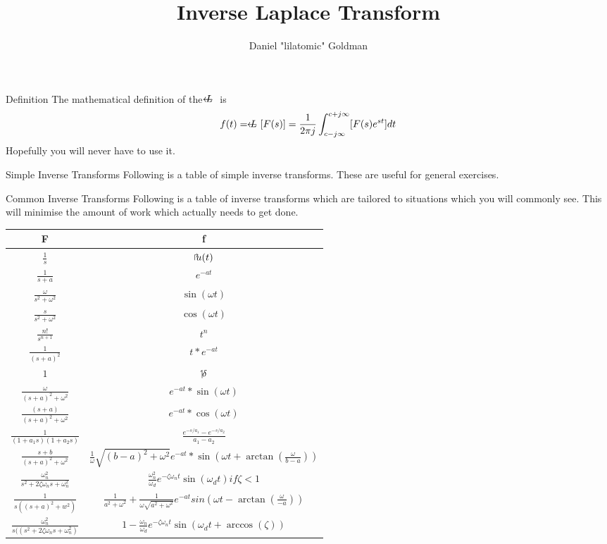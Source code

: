 \documentclass{../templates/mathtool}
\title{Inverse Laplace Transform}
\author{Daniel "lilatomic" Goldman}
\begin{document}
\maketitle

\begin{section}{Definition}
	The mathematical definition of the $\ilaplace$ is
	\begin{equation}
		f(t) = \ilaplace[F(s)] = \frac{1}{2\pi j}\int_{c-j\infty}^{c+j\infty}[F(s)e^{st}]dt
	\end{equation}
	Hopefully you will never have to use it.
\end{section}

\begin{section}{Simple Inverse Transforms}
	Following is a table of simple inverse transforms. These are useful for general exercises.
\end{section}

\begin{section}{Common Inverse Transforms}
	Following is a table of inverse transforms which are tailored to situations which you will commonly see. This will minimise the amount of work which actually needs to get done.
	
\end{section}
	\begin{tabular}{|c|c|}
		\hline
		F & f \\
		\hline \hline
		$\frac{1}{s}$ & $\ustep(t)$ \\
			\hline
		$\frac{1}{s+a}$ & $e^{-at}$ \\
			\hline
		$\frac{\omega}{s^2+\omega^2}$ & $\sin{(\omega t)}$ \\
			\hline
		$\frac{s}{s^2+\omega^2}$ & $\cos{(\omega t)}$ \\
			\hline
		$\frac{n!}{s^{n+1}}$ & $t^n$ \\
			\hline
		$\frac{1}{(s+a)^2}$ & $t*e^{-at}$ \\
			\hline
		$1$ & $\impulse$ \\
			\hline
		$\frac{\omega}{(s+a)^2+\omega^2}$ & $e^{-at}*\sin{(\omega t)}$ \\
			\hline
		$\frac{(s+a)}{(s+a)^2+\omega^2}$ & $e^{-at}*\cos{(\omega t)}$ \\
			\hline
		$\frac{1}{(1+a_1s)(1+a_2s)}$ & $\frac{e^{-s/a_1}-e^{-s/a_2}}{a_1-a_2}$ \\
			\hline
		$\frac{s+b}{(s+a)^2+\omega^2}$ & $\frac{1}{\omega}\sqrt{(b-a)^2+\omega^2} e^{-at}*\sin{(\omega t+\arctan(\frac{\omega}{b-a}))}$ \\
			\hline
		$\frac{\omega_n^2}{s^2+2\zeta\omega_n s+\omega_n^2}$ & $\frac{\omega_n^2}{\omega_d}e^{-\zeta\omega_n t}\sin{(\omega_d t)} if \zeta < 1$ \\
			\hline
		$\frac{1}{s((s+a)^2+w^2)}$ & $\frac{1}{a^2+\omega^2}+\frac{1}{\omega\sqrt{a^2+\omega^2}}e^{-at}sin{(\omega t - \arctan{(\frac{\omega}{-a})})}$ \\
			\hline
		$\frac{\omega_n^2}{s((s^2 + 2\zeta\omega_n s + \omega_n^2)}$ & $1-\frac{\omega_n}{\omega_d}e^{-\zeta\omega_n t}\sin{(\omega_d t + \arccos{(\zeta)})}$ \\
		\hline
	\end{tabular}
	
\end{document}
